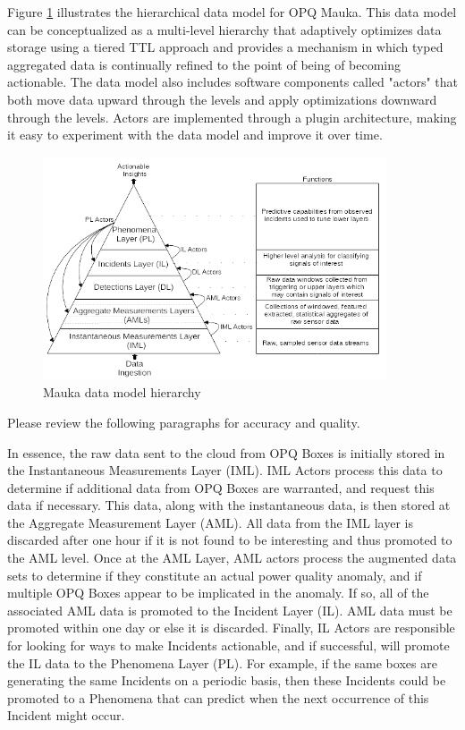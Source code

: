 Figure \ref{fig:mauka-data-model} illustrates the hierarchical data model for OPQ Mauka. This data model can be conceptualized as a multi-level hierarchy that adaptively optimizes data storage using a tiered TTL approach and provides a mechanism in which typed aggregated data is continually refined to the point of being of becoming actionable. The data model also includes software components called "actors" that both move data upward through the levels and apply optimizations downward through the levels. Actors are implemented through a plugin architecture, making it easy to experiment with the data model and improve it over time.

\begin{figure}
\center \includegraphics[width=4in]{images/mauka/mauka-data-model.png}
\caption{Mauka data model hierarchy}
\label{fig:mauka-data-model}
\end{figure}

\begin{tcolorbox}[colback=red!5!white,colframe=red!75!black,title=ANTHONY]
Please review the following paragraphs for accuracy and quality.
\end{tcolorbox}

In essence, the raw data sent to the cloud from OPQ Boxes is initially stored in the Instantaneous Measurements Layer (IML). IML Actors process this data to determine if additional data from OPQ Boxes are warranted, and request this data if necessary. This data, along with the instantaneous data, is then stored at the Aggregate Measurement Layer (AML).  All data from the IML layer is discarded after one hour if it is not found to be interesting and thus promoted to the AML level. Once at the AML Layer, AML actors process the augmented data sets to determine if they constitute an actual power quality anomaly, and if multiple OPQ Boxes appear to be implicated in the anomaly. If so, all of the associated AML data is promoted to the Incident Layer (IL).  AML data must be promoted within one day or else it is discarded.  Finally, IL Actors are responsible for looking for ways to make Incidents actionable, and if successful, will promote the IL data to the Phenomena Layer (PL). For example, if the same boxes are generating the same Incidents on a periodic basis, then these Incidents could be promoted to a Phenomena that can predict when the next occurrence of this Incident might occur.

